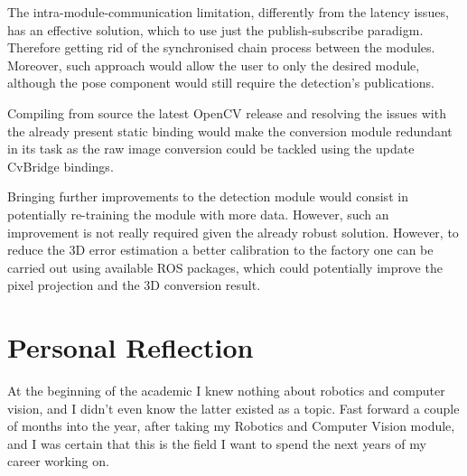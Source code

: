 The intra-module-communication limitation, differently from the latency issues, has an effective solution, which to use just the publish-subscribe paradigm. Therefore getting rid of the synchronised chain process between the modules. Moreover, such approach would allow the user to only the desired module, although the pose component would still require the detection's publications.

Compiling from source the latest OpenCV release and resolving the issues with the already present static binding would make the conversion module redundant in its task as the raw image conversion could be tackled using the update CvBridge bindings.

Bringing further improvements to the detection module would consist in potentially re-training the module with more data. However, such an improvement is not really required given the already robust solution. However, to reduce the 3D error estimation a better calibration to the factory one can be carried out using available ROS packages, which could potentially improve the pixel projection and the 3D conversion result.

\section{Personal Reflection}

At the beginning of the academic I knew nothing about robotics and computer vision, and I didn't even know the latter existed as a topic. Fast forward a couple of months into the year, after taking my Robotics and Computer Vision module, and I was certain that this is the field I want to spend the next years of my career working on.









